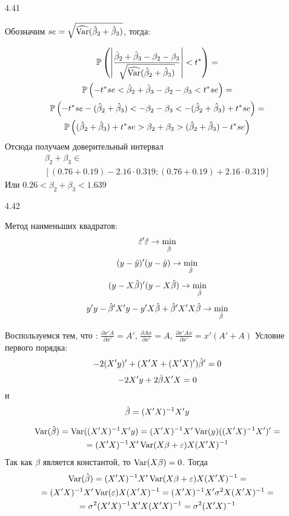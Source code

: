 \begin{solution}{{4.41}}
\begin{enumerate}
Обозначим $se=\sqrt{\widehat{\operatorname{Var}}(\hat{\beta}_2 + \hat{\beta}_3)}$, тогда:

\begin{multline*}
\mathbb{P} \left( \left| \frac{\hat{\beta}_2 + \hat{\beta}_3 - \beta_2 - \beta_3}{\sqrt{\widehat{\operatorname{Var}}(\hat{\beta}_2 + \hat{\beta}_3)}} \right| < t^* \right) = \\
\mathbb{P} \left( -t^* se < \hat{\beta}_2 + \hat{\beta}_3 - \beta_2 - \beta_3 < t^* se \right) = \\
\mathbb{P} \left( -t^*se  - (\hat{\beta}_2 + \hat{\beta}_3) < - \beta_2 - \beta_3  < -(\hat{\beta}_2 + \hat{\beta}_3) + t^* se \right) =\\
\mathbb{P} \left( (\hat{\beta}_2 + \hat{\beta}_3) + t^* se
> \beta_2 + \beta_3
> (\hat{\beta}_2 + \hat{\beta}_3) - t^* se \right)
\end{multline*}
Отсюда получаем доверительный интервал
\begin{multline*}
\beta_2 + \beta_3 \in \\
[(0.76 + 0.19) - 2.16 \cdot 0.319;  (0.76 + 0.19) + 2.16 \cdot 0.319 ]
\end{multline*}
Или $0.26< \beta_2 + \beta_3  < 1.639  $
\end{enumerate}
\end{solution}
\protect \hypertarget {soln:4.42}{}
\begin{solution}{{4.42}}

Метод наименьших квадратов:
\[\hat{\varepsilon}'\hat{\varepsilon}\rightarrow \min_{\hat{\beta}}\]
\[(y-\hat{y})'(y-\hat{y})\rightarrow\min_{\hat{\beta}}\]
\[(y-X\hat{\beta})'(y-X\hat{\beta})\rightarrow\min_{\hat{\beta}}\]
\[y'y-\hat{\beta}' X'y-y'X\hat{\beta}+\hat{\beta}'X'X\hat{\beta}\rightarrow\min_{\hat{\beta}}\]

Воспользуемся тем, что : $\frac{\partial x'A}{\partial x'}=A'$, $\frac{\partial Ax}{\partial x'}=A$,
$\frac{\partial x'Ax}{\partial x'}=x'(A'+A)$
Условие первого порядка:
\[-2(X'y)'+(X'X+(X'X)')\hat{\beta}'=0\]
\[-2X'y+2\hat{\beta} X'X=0\]
и
\[\hat{\beta}=(X'X)^{-1}X'y\]

\begin{multline*}
\operatorname{Var}(\hat\beta)=\operatorname{Var}((X'X)^{-1}X'y)=(X'X)^{-1}X'\operatorname{Var}(y)((X'X)^{-1}X')'=\\
=(X'X)^{-1}X'\operatorname{Var}(X\beta+\varepsilon)X(X'X)^{-1}
\end{multline*}
Так как $\beta$ является константой, то $\operatorname{Var}(X\beta)=0$. Тогда
\begin{multline*}
\operatorname{Var}(\hat\beta)=(X'X)^{-1}X'\operatorname{Var}(X\beta+\varepsilon)X(X'X)^{-1}=\\=(X'X)^{-1}X'\operatorname{Var}(\varepsilon)X(X'X)^{-1}=
(X'X)^{-1}X'\sigma^2X(X'X)^{-1}=\\=\sigma^2(X'X)^{-1}X'X(X'X)^{-1}=\sigma^2(X'X)^{-1}
\end{multline*}
\end{solution}
\protect \hypertarget {soln:4.43}{}
